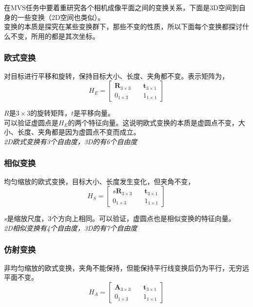 \documentclass[hpyerref,UTF8,a4paper,titlepage,12pt,oneside]{ctexbook}
\theoremstyle{definition}
\begin{document}
	在MVS任务中要着重研究各个相机成像平面之间的变换关系，下面是3D空间到自身的一些变换（2D空间也类似）。\\

	变换的本质是探究在某些变换群下，那些不变的性质，所以下面每个变换都探讨什么不变，所用的都是其次坐标。

	\subsubsection{欧式变换}
		对目标进行平移和旋转，保持目标大小、长度、夹角都不变。表示矩阵为，
		$$
			H_E = \begin{bmatrix}
				\mathbf{R}_{3\times 3}\quad& \mathbf{t}_{3\times 1}\\
				0_{1\times 3} \quad& 1_{1\times 1}
			\end{bmatrix}
		$$

		$R$是$3\times 3$的旋转矩阵，$t$是平移向量。\\

		可以验证虚圆点是$H_E$的两个特征向量。这说明欧式变换的本质是虚圆点不变，大小、长度、夹角都是因为虚圆点不变而成立。\\

		\textit{2D欧式变换有3个自由度，3D的有6个自由度}

	\subsubsection{相似变换}
		均匀缩放的欧式变换，目标大小、长度发生变化，但夹角不变，
		$$
			H_S = \begin{bmatrix}
				s\mathbf{R}_{3\times 3}\quad& \mathbf{t}_{3\times 1}\\
				0_{1\times 3} \quad& 1_{1\times 1}
			\end{bmatrix}
		$$

		$s$是缩放尺度，3个方向上相同。可以验证，虚圆点也是相似变换的特征向量。\\

		\textit{2D相似变换有4个自由度，3D的有7个自由度}
	
	\subsubsection{仿射变换}
		非均匀缩放的欧式变换，夹角不能保持，但能保持平行线变换后仍为平行，无穷远平面不变。
		$$
			H_A = \begin{bmatrix}
				\mathbf{A}_{3\times 3}\quad& \mathbf{t}_{3\times 1}\\
				0_{1\times 3} \quad& 1_{1\times 1}
			\end{bmatrix}
		$$
\end{document}
